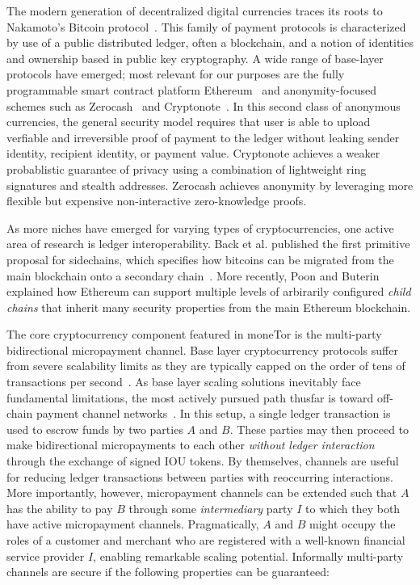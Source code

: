 The modern generation of decentralized digital currencies traces its roots to
Nakamoto's Bitcoin protocol~\cite{nakamoto2008bitcoin}. This family of payment
protocols is characterized by use of a public distributed ledger, often a
blockchain, and a notion of identities and ownership based in public key
cryptography. A wide range of base-layer protocols have emerged; most
relevant for our purposes are the fully programmable smart contract platform
Ethereum~\cite{wood2014ethereum} and anonymity-focused schemes such as
Zerocash~\cite{sasson2014zerocash} and Cryptonote~\cite{van2013cryptonote}. In
this second class of anonymous currencies, the general security model requires
that user is able to upload verfiable and irreversible proof of payment to the
ledger without leaking sender identity, recipient identity, or payment
value. Cryptonote achieves a weaker probablistic guarantee of privacy using
a combination of lightweight ring signatures and stealth addresses. Zerocash
achieves anonymity by leveraging more flexible but expensive non-interactive
zero-knowledge proofs.

As more niches have emerged for varying types of cryptocurrencies, one active
area of research is ledger interoperability. Back et al. published the first
primitive proposal for sidechains, which specifies how bitcoins can be migrated
from the main blockchain onto a secondary chain~\cite{back2014enabling}.  More
recently, Poon and Buterin explained how Ethereum can support multiple levels of
arbirarily configured \emph{child chains} that inherit many security properties
from the main Ethereum blockchain.

The core cryptocurrency component featured in moneTor is the multi-party
bidirectional micropayment channel. Base layer cryptocurrency protocols suffer
from severe scalability limits as they are typically capped on the order of tens
of transactions per second~\cite{team2018blockchain}. As base layer scaling
solutions inevitably face fundamental limitations, the most actively pursued
path thusfar is toward off-chain payment channel
networks~\cite{poon2016bitcoin}. In this setup, a single ledger transaction is
used to escrow funds by two parties $A$ and $B$. These parties may then proceed
to make bidirectional micropayments to each other \emph{without ledger
  interaction} through the exchange of signed IOU tokens. By themselves,
channels are useful for reducing ledger transactions between parties with
reoccurring interactions. More importantly, however, micropayment channels can
be extended such that $A$ has the ability to pay $B$ through some
\emph{intermediary} party $I$ to which they both have active micropayment
channels. Pragmatically, $A$ and $B$ might occupy the roles of a customer and
merchant who are registered with a well-known financial service provider $I$,
enabling remarkable scaling potential. Informally multi-party channels are
secure if the following properties can be guaranteed:


